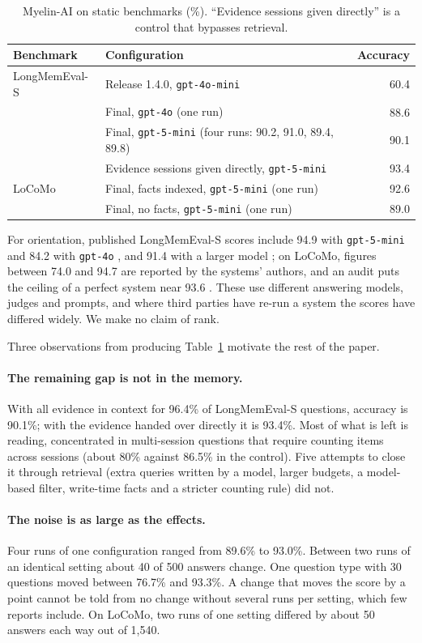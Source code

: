 \documentclass[11pt]{article}
\begin{document}
\begin{table}[t]
\centering
\small
\begin{tabular}{llr}
\toprule
Benchmark & Configuration & Accuracy \\
\midrule
LongMemEval-S & Release 1.4.0, \texttt{gpt-4o-mini} & 60.4 \\
 & Final, \texttt{gpt-4o} (one run) & 88.6 \\
 & Final, \texttt{gpt-5-mini} (four runs: 90.2, 91.0, 89.4, 89.8) & 90.1 \\
 & Evidence sessions given directly, \texttt{gpt-5-mini} & 93.4 \\
LoCoMo & Final, facts indexed, \texttt{gpt-5-mini} (one run) & 92.6 \\
 & Final, no facts, \texttt{gpt-5-mini} (one run) & 89.0 \\
\bottomrule
\end{tabular}
\caption{\mbox{Myelin-AI} on static benchmarks (\%). ``Evidence sessions given
directly'' is a control that bypasses retrieval.}
\label{tab:static}
\end{table}

For orientation, published LongMemEval-S scores include 94.9 with
\texttt{gpt-5-mini} and 84.2 with \texttt{gpt-4o}
\citep{mastra2026om}, and 91.4 with a larger model
\citep{hindsight2025}; on LoCoMo, figures between 74.0 and 94.7 are
reported by the systems' authors, and an audit puts the ceiling of a
perfect system near 93.6 \citep{penfield2026locomo}. These use
different answering models, judges and prompts, and where third
parties have re-run a system the scores have differed widely. We make
no claim of rank.

Three observations from producing Table~\ref{tab:static} motivate the
rest of the paper.

\paragraph{The remaining gap is not in the memory.} With all evidence
in context for 96.4\% of LongMemEval-S questions, accuracy is 90.1\%;
with the evidence handed over directly it is 93.4\%. Most of what is
left is reading, concentrated in multi-session questions that require
counting items across sessions (about 80\% against 86.5\% in the
control). Five attempts to close it through retrieval (extra queries
written by a model, larger budgets, a model-based filter, write-time
facts and a stricter counting rule) did not.

\paragraph{The noise is as large as the effects.} Four runs of one
configuration ranged from 89.6\% to 93.0\%. Between two runs of an
identical setting about 40 of 500 answers change. One question type
with 30 questions moved between 76.7\% and 93.3\%. A change that moves
the score by a point cannot be told from no change without several
runs per setting, which few reports include. On LoCoMo, two runs of
one setting differed by about 50 answers each way out of 1{,}540.
\end{document}

